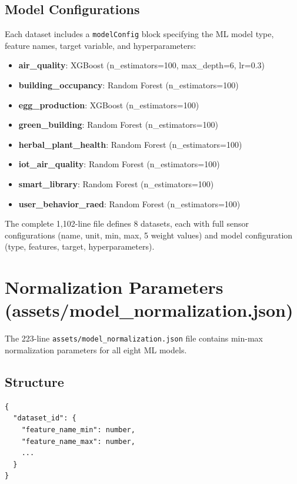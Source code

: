 \documentclass[12pt,a4paper,oneside]{report}
\begin{document}
\section{Model Configurations}

Each dataset includes a \texttt{modelConfig} block specifying the ML model type, feature names, target variable, and hyperparameters:

\begin{itemize}
  \item \textbf{air\_quality}: XGBoost (n\_estimators=100, max\_depth=6, lr=0.3)
  \item \textbf{building\_occupancy}: Random Forest (n\_estimators=100)
  \item \textbf{egg\_production}: XGBoost (n\_estimators=100)
  \item \textbf{green\_building}: Random Forest (n\_estimators=100)
  \item \textbf{herbal\_plant\_health}: Random Forest (n\_estimators=100)
  \item \textbf{iot\_air\_quality}: Random Forest (n\_estimators=100)
  \item \textbf{smart\_library}: Random Forest (n\_estimators=100)
  \item \textbf{user\_behavior\_raed}: Random Forest (n\_estimators=100)
\end{itemize}

The complete 1,102-line file defines 8 datasets, each with full sensor configurations (name, unit, min, max, 5 weight values) and model configuration (type, features, target, hyperparameters).

\chapter{Normalization Parameters (assets/model\_normalization.json)}
\label{ch:norm}

The 223-line \texttt{assets/model\_normalization.json} file contains min-max normalization parameters for all eight ML models.

\section{Structure}

\begin{lstlisting}[style=jsonstyle]
{
  "dataset_id": {
    "feature_name_min": number,
    "feature_name_max": number,
    ...
  }
}
\end{lstlisting}
\end{document}
